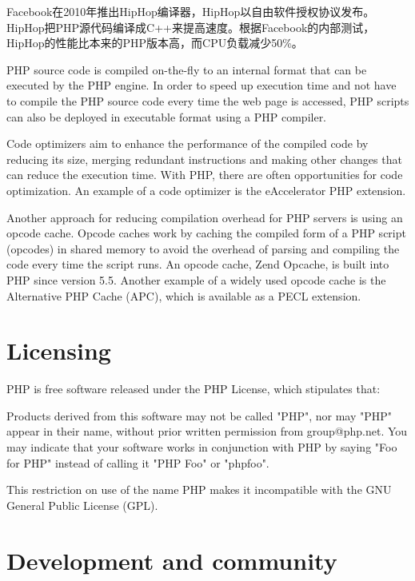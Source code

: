 Facebook在2010年推出HipHop编译器，HipHop以自由软件授权协议发布。HipHop把PHP源代码编译成C++来提高速度。根据Facebook的内部测试，HipHop的性能比本来的PHP版本高，而CPU负载减少50\%。

PHP source code is compiled on-the-fly to an internal format that can be executed by the PHP engine. In order to speed up execution time and not have to compile the PHP source code every time the web page is accessed, PHP scripts can also be deployed in executable format using a PHP compiler.


Code optimizers aim to enhance the performance of the compiled code by reducing its size, merging redundant instructions and making other changes that can reduce the execution time. With PHP, there are often opportunities for code optimization. An example of a code optimizer is the eAccelerator PHP extension.

Another approach for reducing compilation overhead for PHP servers is using an opcode cache. Opcode caches work by caching the compiled form of a PHP script (opcodes) in shared memory to avoid the overhead of parsing and compiling the code every time the script runs. An opcode cache, Zend Opcache, is built into PHP since version 5.5. Another example of a widely used opcode cache is the Alternative PHP Cache (APC), which is available as a PECL extension.





\chapter{Licensing}

PHP is free software released under the PHP License, which stipulates that:

Products derived from this software may not be called "PHP", nor may "PHP" appear in their name, without prior written permission from group@php.net. You may indicate that your software works in conjunction with PHP by saying "Foo for PHP" instead of calling it "PHP Foo" or "phpfoo".


This restriction on use of the name PHP makes it incompatible with the GNU General Public License (GPL).





\chapter{Development and community}

